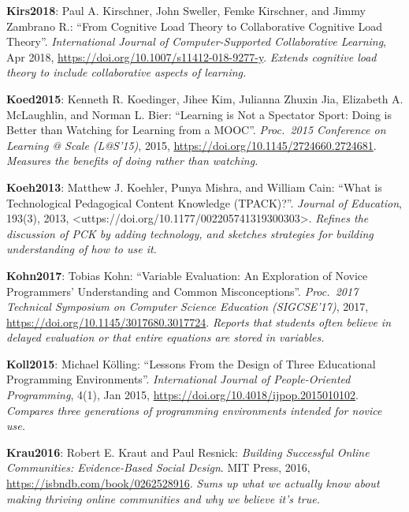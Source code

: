 \textbf{\hypertarget{b:Kirs2018}{Kirs2018}\label{b:Kirs2018}}: Paul A. Kirschner, John Sweller, Femke Kirschner, and Jimmy Zambrano R.: ``From Cognitive Load Theory to Collaborative Cognitive Load Theory''. \emph{International Journal of Computer-Supported Collaborative Learning}, Apr 2018, \url{https://doi.org/10.1007/s11412-018-9277-y}. \emph{Extends cognitive load theory to include collaborative aspects of learning.}

\textbf{\hypertarget{b:Koed2015}{Koed2015}\label{b:Koed2015}}: Kenneth R. Koedinger, Jihee Kim, Julianna Zhuxin Jia, Elizabeth A. McLaughlin, and Norman L. Bier: ``Learning is Not a Spectator Sport: Doing is Better than Watching for Learning from a MOOC''. \emph{Proc.\ 2015 Conference on Learning @ Scale (L@S'15)}, 2015, \url{https://doi.org/10.1145/2724660.2724681}. \emph{Measures the benefits of doing rather than watching.}

\textbf{\hypertarget{b:Koeh2013}{Koeh2013}\label{b:Koeh2013}}: Matthew J. Koehler, Punya Mishra, and William Cain: ``What is Technological Pedagogical Content Knowledge (TPACK)?''. \emph{Journal of Education}, 193(3), 2013, \textless{}uttps://doi.org/10.1177/002205741319300303\textgreater{}. \emph{Refines the discussion of PCK by adding technology, and sketches strategies for building understanding of how to use it.}

\textbf{\hypertarget{b:Kohn2017}{Kohn2017}\label{b:Kohn2017}}: Tobias Kohn: ``Variable Evaluation: An Exploration of Novice Programmers' Understanding and Common Misconceptions''. \emph{Proc.\ 2017 Technical Symposium on Computer Science Education (SIGCSE'17)}, 2017, \url{https://doi.org/10.1145/3017680.3017724}. \emph{Reports that students often believe in delayed evaluation or that entire equations are stored in variables.}

\textbf{\hypertarget{b:Koll2015}{Koll2015}\label{b:Koll2015}}: Michael Kölling: ``Lessons From the Design of Three Educational Programming Environments''. \emph{International Journal of People-Oriented Programming}, 4(1), Jan 2015, \url{https://doi.org/10.4018/ijpop.2015010102}. \emph{Compares three generations of programming environments intended for novice use.}

\textbf{\hypertarget{b:Krau2016}{Krau2016}\label{b:Krau2016}}: Robert E. Kraut and Paul Resnick: \emph{Building Successful Online Communities: Evidence-Based Social Design}. MIT Press, 2016, \url{https://isbndb.com/book/0262528916}. \emph{Sums up what we actually know about making thriving online communities and why we believe it's true.}

